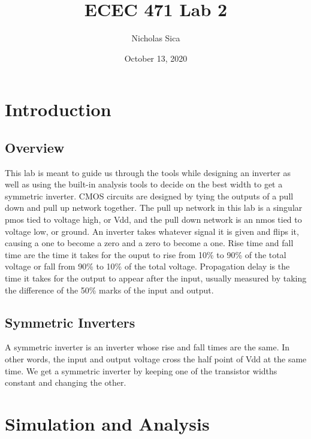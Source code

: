 \documentclass[12pt]{article}
\begin{document}
\title{ECEC 471 Lab 2}
\author{Nicholas Sica}
\date{October 13, 2020}
\maketitle

\section{Introduction}
\subsection{Overview}
This lab is meant to guide us through the tools while designing an inverter as well as using the built-in analysis tools to decide on the best width to get a symmetric inverter.
CMOS circuits are designed by tying the outputs of a pull down and pull up network together. The pull up network in this lab is a singular pmos tied to voltage high, or Vdd, and
the pull down network is an nmos tied to voltage low, or ground. An inverter takes whatever signal it is given and flips it, causing a one to become a zero and a zero to become a one.
Rise time and fall time are the time it takes for the ouput to rise from 10\% to 90\% of the total voltage or fall from 90\% to 10\% of the total voltage.
Propagation delay is the time it takes for the output to appear after the input, usually measured by taking the difference of the 50\% marks of the input and output.
\subsection{Symmetric Inverters}
A symmetric inverter is an inverter whose rise and fall times are the same. In other words, the input and output voltage cross the half point of Vdd at the same time. We get a
symmetric inverter by keeping one of the transistor widths constant and changing the other.
\section{Simulation and Analysis}
\end{document}
